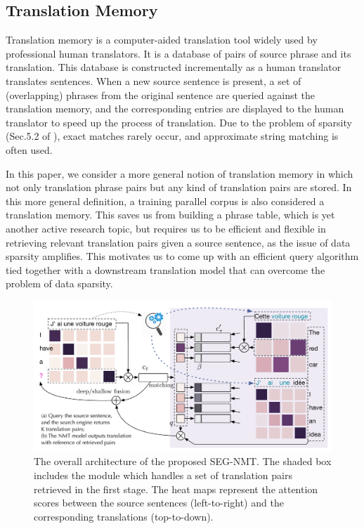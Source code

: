 \subsection{Translation Memory}

Translation memory is a computer-aided translation tool widely used by professional human translators. It is a database of pairs of source phrase and its translation. This database is constructed incrementally as a human translator translates sentences. When a new source sentence is present, a set of (overlapping) phrases from the original sentence are queried against the translation memory, and the corresponding entries are displayed to the human translator to speed up the process of translation. Due to the problem of sparsity (Sec.5.2 of \cite{cho2015natural} ), exact matches rarely occur, and approximate string matching is often used.

In this paper, we consider a more general notion of translation memory in which not only translation phrase pairs but any kind of translation pairs are stored. In this more general definition, a training parallel corpus is also considered a translation memory. This saves us from building a phrase table\citep{koehn2003statistical}, which is yet another active research topic, but requires us to be efficient and flexible in retrieving relevant translation pairs given a source sentence, as the issue of data sparsity amplifies. This motivates us to come up with an efficient query algorithm tied together with a downstream translation model that can overcome the problem of data sparsity.



\begin{figure}[t]
\centering
\includegraphics[width=\linewidth]{figs/seg/framework2.pdf}
\caption{\label{fig.tmnmt} The overall architecture of the proposed SEG-NMT. The shaded box includes the module which handles a set of translation pairs retrieved in the first stage. The heat maps represent the attention scores between the source sentences (left-to-right) and the corresponding translations (top-to-down).}
\end{figure}


